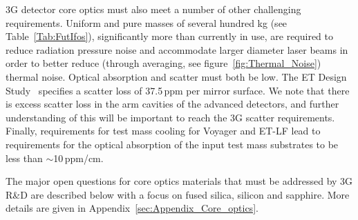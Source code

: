 3G detector core optics must also meet a number of other challenging requirements.  Uniform and pure masses of several hundred kg (see Table~\ref{Tab:FutIfos}), significantly more than currently in use, are required to reduce radiation pressure noise and accommodate larger diameter laser beams in order to better reduce (through averaging, see figure~\ref{fig:Thermal_Noise}) thermal noise. Optical absorption and scatter must both be low. The ET Design Study~\cite{ET2011} specifies a scatter loss of 37.5\,ppm per mirror surface. We note that there is excess scatter loss in the arm cavities of the advanced detectors, and further understanding of this will be important to reach the 3G scatter requirements. Finally, requirements for test mass cooling for Voyager and ET-LF lead to requirements for the optical absorption of the input test mass substrates to be less than $\sim$10\,ppm/cm.

The major open questions for core optics materials that must be addressed by 3G R\&D are described below with a focus on fused silica, silicon and sapphire. More details are given in Appendix~\ref{sec:Appendix_Core_optics}.





